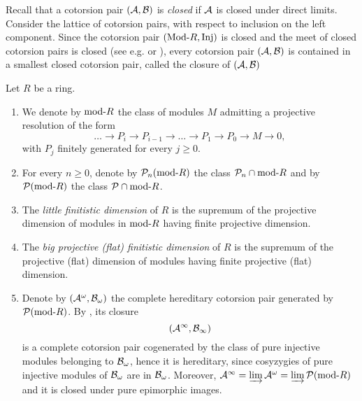  Recall that a cotorsion pair  $(\mathcal{A}, \mathcal{B})$ is \emph{closed} if $\mathcal{A}$ is closed under direct limits. Consider the lattice of cotorsion pairs, with respect to inclusion on the left component.
Since the cotorsion pair $(\mathrm{Mod}\textrm{-}{R}, \mathrm{Inj})$ is closed and the meet of closed cotorsion pairs is closed (see e.g. \cite{AT} or \cite[Lemma 6.1]{G6}), every cotorsion pair $(\mathcal{A}, \mathcal{B})$ is contained in a smallest closed cotorsion pair, called the closure of $(\mathcal{A}, \mathcal{B})$
\begin{nota}\label{N:notations} Let $R$ be a ring.
\begin{enumerate}
\item We denote by $\mathrm{mod}\textrm{-}{R}$ the class of modules $M$ admitting a projective resolution of the form
\[\dots\to P_i\to P_{i-1}\to \dots\to P_1\to P_0\to M\to 0,\]
with $P_j$ finitely generated  for every $j \geq 0$.
\item For every $n\geq 0$, denote by $\mathcal{P}_n(\mathrm{mod}\textrm{-}{R})$  the class $\mathcal{P}_n\cap\mathrm{mod}\textrm{-}{R}$ and by $\mathcal{P}(\mathrm{mod}\textrm{-}{R})$  the class $ \mathcal{P}\cap\mathrm{mod}\textrm{-}{R}$.
%
\item The \emph{little finitistic dimension} of $R$ is the supremum of the projective dimension of modules in $\mathrm{mod}\textrm{-}{R}$ having finite projective dimension.
\item The \emph{big projective (flat) finitistic dimension}  of $R$ is  the supremum of the projective (flat) dimension of modules having finite projective (flat) dimension.
\item Denote by $(\mathcal{A}^{\omega}, \mathcal{B}_{\omega})$ the complete hereditary cotorsion pair generated by $\mathcal{P}(\mathrm{mod}\textrm{-}{R})$. By \cite[Theorem 2.3, Corollary 2.4]{AT}, its closure
\[(\mathcal{A}^{\infty}, \mathcal{B}_{\infty})
\]  is a complete cotorsion pair cogenerated by the class of pure injective modules belonging to $\mathcal{B}_{\omega}$, hence it is hereditary, since cosyzygies of pure injective modules of $\mathcal{B}_{\omega}$ are in $\mathcal{B}_{\omega}$. Moreover, $\mathcal{A}^{\infty}=\varinjlim \mathcal{A}^{\omega}=\varinjlim \mathcal{P}(\mathrm{mod}\textrm{-}{R})$ and it is closed under pure epimorphic images.
\end{enumerate}
\end{nota}

